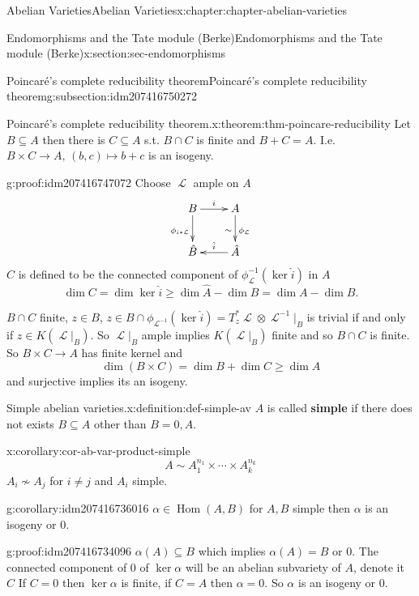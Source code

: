 \documentclass[oneside,10pt,]{book}
\newcommand{\terminology}[1]{\textbf{#1}}
\numberwithin{equation}{section}
\newcommand{\sheaf}[1]{\operatorname{\mathcal{#1}}}
\DeclareMathOperator{\Hom}{Hom}
\begin{document}
\begin{chapterptx}{Abelian Varieties}{}{Abelian Varieties}{}{}{x:chapter:chapter-abelian-varieties}
\begin{sectionptx}{Endomorphisms and the Tate module (Berke)}{}{Endomorphisms and the Tate module (Berke)}{}{}{x:section:sec-endomorphisms}
\begin{subsectionptx}{Poincaré's complete reducibility theorem}{}{Poincaré's complete reducibility theorem}{}{}{g:subsection:idm207416750272}
\begin{theorem}{Poincaré's complete reducibility theorem.}{}{x:theorem:thm-poincare-reducibility}
Let \(B\subseteq A\) then there is \(C\subseteq A\) s.t. \(B \cap C\) is finite and \(B+C = A\). I.e. \(B\times C \to A,\,(b,c) \mapsto b+c\) is an isogeny.%
\end{theorem}
\begin{proofptx}{}{g:proof:idm207416747072}
Choose \(\sheaf L\) ample on \(A\)%
\begin{equation*}
\xymatrix{
B\ar[r]^i \ar[d]_{\phi_{i*\sheaf L}} & A \ar[d]_\sim^{\phi_{\sheaf L}} \\
\hat B & \hat A \ar[l]_{\hat i}
}
\end{equation*}
\(C\) is defined to be the connected component of \(\phi^{-1}_{\sheaf L}(\ker \hat i)\) in \(A\)%
\begin{equation*}
\dim C = \dim \ker \hat i \ge \dim \hat A - \dim \hat B = \dim A - \dim B\text{.}
\end{equation*}
%
\par
\(B \cap C\) finite, \(z\in B\), \(z\in B\cap \phi_{\sheaf L^{-1}} (\ker \hat i) = T_z^* \sheaf L \otimes \sheaf L^{-1} |_B\) is trivial if and only if \(z\in K(\sheaf L|_B)\). So \(\sheaf L|_B\) ample implies \(K(\sheaf L|_B)\) finite and so \(B\cap C\) is finite. So \(B\times C \to A\) has finite kernel and%
\begin{equation*}
\dim (B\times C) = \dim B + \dim C \ge \dim A
\end{equation*}
and surjective implies its an isogeny.%
\end{proofptx}
\begin{definition}{Simple abelian varieties.}{x:definition:def-simple-av}%
\(A\) is called \terminology{simple} if there does not exists \(B\subseteq A\) other than \(B = 0,A\).%
\end{definition}
\begin{corollary}{}{}{x:corollary:cor-ab-var-product-simple}%
%
\begin{equation*}
A \sim A_1^{n_1} \times \cdots \times A_k^{n_k}
\end{equation*}
\(A_i \not\sim A_j\) for \(i\ne j\) and \(A_i\) simple.%
\end{corollary}
\begin{corollary}{}{}{g:corollary:idm207416736016}%
\(\alpha \in \Hom(A,B)\) for \(A,B\) simple then \(\alpha\) is an isogeny or \(0\).%
\end{corollary}
\begin{proofptx}{}{g:proof:idm207416734096}
\(\alpha(A) \subseteq B\) which implies \(\alpha(A)  = B\) or \(0\). The connected component of 0 of \(\ker \alpha\) will be an abelian subvariety of \(A\), denote it \(C\) If \(C = 0\) then \(\ker \alpha\) is finite, if \(C = A\) then \(\alpha = 0\). So \(\alpha\) is an isogeny or \(0\).%

\end{proofptx}
\end{subsectionptx}
\end{sectionptx}
\end{chapterptx}
\end{document}
